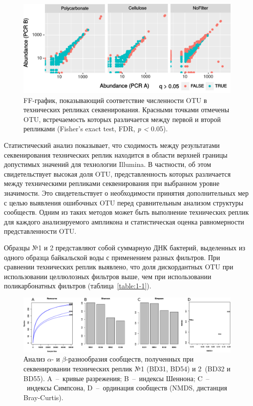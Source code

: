 \documentclass[a4paper,12pt,openany,final]{extreport}
\def\oldcaption{} \let\oldcaption=\caption
\def\caption{\stepcounter{captionsnum}\oldcaption}
\begin{document}
\begin{figure}[bhtp]\centering
\includegraphics[width=0.9\linewidth]{media/image5.png}

\caption{FF-график, показывающий соответствие численности OTU в технических
репликах секвенирования. Красными точками отмечены OTU, встречаемость
которых различается между первой и второй репликами (Fisher's exact
test, FDR, \emph{p \textless{}} 0.05).}\label{fig:1-1}
\end{figure}

Статистический анализ показывает, что сходимость между результатами секвенирования технических реплик находится в области верхней границы допустимых значений для технологии Illumina. В частности, об этом свидетельствует высокая доля OTU, представленность которых различается между техническими репликами секвенирования при выбранном уровне значимости. Это свидетельствует о необходимости принятия дополнительных мер с целью выявления ошибочных OTU перед сравнительным анализом структуры сообществ. Одним из таких методов может быть выполнение технических реплик для каждого анализируемого ампликона и статистическая оценка равномерности представленности OTU.

Образцы №1 и 2 представляют собой суммарную ДНК бактерий, выделенных из одного образца байкальской воды с применением разных фильтров. При сравнении технических реплик выявлено, что доля дискордантных OTU при использовании целлюлозных фильтров выше, чем при использовании поликарбонатных фильтров (таблица~\ref{table:1-1}).

\begin{figure}\centering
  \includegraphics[width=0.9\linewidth]{media/image6.png}
  \caption{Анализ \(\alpha\)- и \(\beta\)-разнообразия сообществ, полученных при секвенировании
технических реплик №1 (BD31, BD54) и 2~(BD32 и BD55). A~--~кривые
разрежения; B~--~индексы Шеннона; C~--~индексы Симпсона, D~--~ординация
сообществ (NMDS, дистанция Bray-Curtis).}\label{fig:2}
\end{figure}
\end{document}
